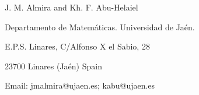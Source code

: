 \documentclass[10pt,a4paper]{amsart}
\theoremstyle{definition}
\begin{document}
\bigskip

\footnotesize{J. M. Almira and Kh. F. Abu-Helaiel

Departamento de Matem\'{a}ticas. Universidad de Ja\'{e}n.

E.P.S. Linares,  C/Alfonso X el Sabio, 28

23700 Linares (Ja\'{e}n) Spain

Email: jmalmira@ujaen.es; kabu@ujaen.es }
\end{document}

